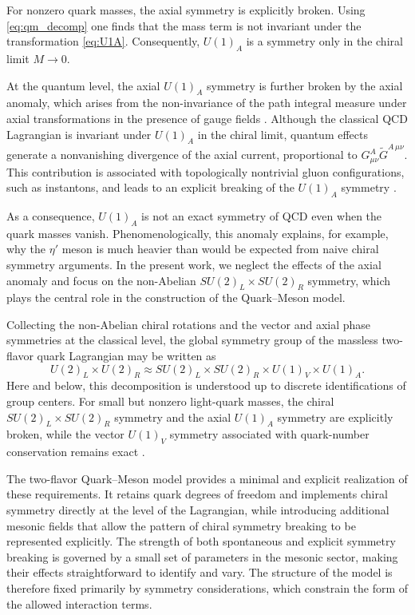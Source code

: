 For nonzero quark masses, the axial symmetry is explicitly broken.
Using \eqref{eq:qm_decomp}
one finds that the mass term is not invariant under the transformation
\eqref{eq:U1A}. Consequently, $U(1)_A$ is a symmetry only in the chiral
limit $M \to 0$.

At the quantum level, the axial $U(1)_A$ symmetry is further broken by
the axial anomaly, which arises from the non-invariance of the path
integral measure under axial transformations in the presence of gauge
fields \cite{Adler1969,BellJackiw1969}. Although the classical QCD
Lagrangian is invariant under $U(1)_A$ in the chiral limit, quantum
effects generate a nonvanishing divergence of the axial current,
proportional to $G^A_{\mu\nu}\tilde G^{A\,\mu\nu}$. This contribution
is associated with topologically nontrivial gluon configurations,
such as instantons, and leads to an explicit breaking of the
$U(1)_A$ symmetry \cite{tHooft1976}. 

As a consequence, $U(1)_A$ is not an exact symmetry of QCD even when
the quark masses vanish. Phenomenologically, this anomaly explains,
for example, why the $\eta'$ meson is much heavier than would be
expected from naive chiral symmetry arguments. In the present work,
we neglect the effects of the axial anomaly and focus on the
non-Abelian $SU(2)_L \times SU(2)_R$ symmetry, which plays the
central role in the construction of the Quark--Meson model.

Collecting the non-Abelian chiral rotations and the vector and axial
phase symmetries at the classical level, the global symmetry group of
the massless two-flavor quark Lagrangian may be written as
\begin{equation}
U(2)_L \times U(2)_R
\approx SU(2)_L \times SU(2)_R \times U(1)_V \times U(1)_A .
\end{equation}
Here and below, this decomposition is understood up to discrete
identifications of group centers.
For small but nonzero light-quark masses, the chiral
$SU(2)_L \times SU(2)_R$ symmetry and the axial $U(1)_A$ symmetry are
explicitly broken, while the vector $U(1)_V$ symmetry associated with
quark-number conservation remains exact
\cite{WeinbergQFT,DonoghueGolowichHolstein}.

The two-flavor Quark--Meson model provides a minimal and explicit
realization of these requirements. It retains quark degrees of
freedom and implements chiral symmetry directly at the level of the
Lagrangian, while introducing additional mesonic fields that allow
the pattern of chiral symmetry breaking to be represented
explicitly. The strength of both spontaneous and explicit symmetry
breaking is governed by a small set of parameters in the mesonic
sector, making their effects straightforward to identify and vary.
The structure of the model is therefore fixed primarily by symmetry
considerations, which constrain the form of the allowed
interaction terms.

